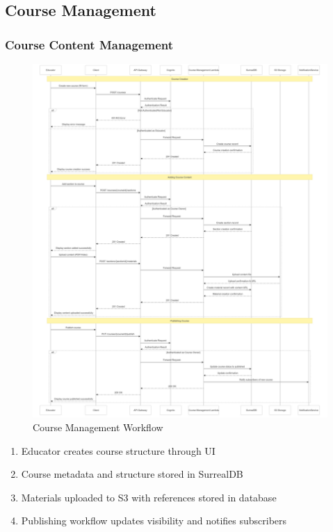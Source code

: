 \documentclass[a4paper, 11pt]{scrreprt}
\begin{document}
\subsection{Course Management}

\subsubsection{Course Content Management}
\begin{figure}[!htb]
    \centering
    \includegraphics[height=0.75\textheight]{educator_managing_courses.png}
    \caption{Course Management Workflow}
\end{figure}


\begin{enumerate}
    \item Educator creates course structure through UI
    \item Course metadata and structure stored in SurrealDB
    \item Materials uploaded to S3 with references stored in database
    \item Publishing workflow updates visibility and notifies subscribers
\end{enumerate}
\end{document}
